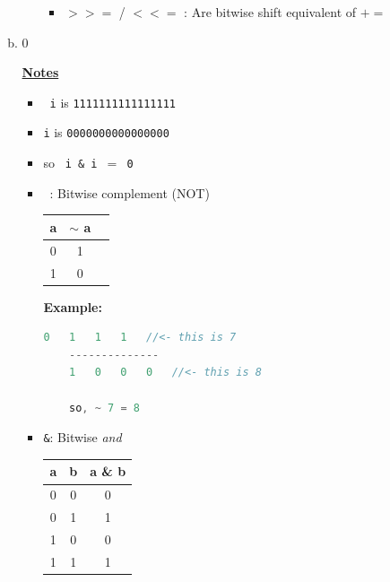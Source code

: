 \documentclass[12pt]{article}
\begin{document}
\begin{enumerate}[1.]
\begin{enumerate}[a)]
\begin{itemize}
\begin{itemize}
                \item \texttt{$>>=$} / \texttt{$<<=$} : Are bitwise shift equivalent of \texttt{$+=$}
            \end{itemize}


        \end{itemize}

        \item 0

        \bigskip

        \underline{\textbf{Notes}}

        \begin{itemize}
            \item \texttt{~i} is \texttt{1111111111111111}
            \item \texttt{i} is \texttt{0000000000000000}
            \item so \texttt{~i \& i $=$ 0}
            \item \texttt{~}: Bitwise complement (NOT)

            \bigskip

            \begin{center}
                \begin{tabular}{|c|c|c|}
                    \hline
                    a & $\sim$ a\\
                    \hline
                    0 & 1\\
                    1 & 0\\
                    \hline
                \end{tabular}
            \end{center}

            \bigskip

            \textbf{Example:}

            \bigskip

\begin{lstlisting}[language=c]
    0   1   1   1   //<- this is 7
    --------------
    1   0   0   0   //<- this is 8

    so, ~ 7 = 8
\end{lstlisting}


            \bigskip
            \item \texttt{\&}: Bitwise \textit{and}

            \bigskip

            \begin{center}
                \begin{tabular}{|c|c|c|}
                    \hline
                    a & b & a \& b\\
                    \hline
                    0 & 0  & 0 \\
                    0 & 1  & 1 \\
                    1 & 0  & 0 \\
                    1 & 1  & 1 \\
                    \hline
                \end{tabular}
            \end{center}


\end{itemize}
\end{enumerate}
\end{enumerate}
\end{document}
